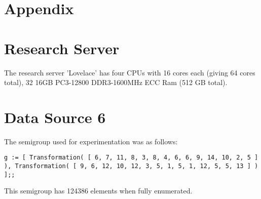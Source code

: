\documentclass{report}
\begin{document}
\section*{Appendix}

\section*{Research Server}
The research server 'Lovelace' has four CPUs with 16 cores each (giving 64 cores total), 32 16GB PC3-12800 DDR3-1600MHz ECC Ram (512 GB total). 

\section*{Data Source 6}
The semigroup used for experimentation was as follows:
\begin{lstlisting}
g := [ Transformation( [ 6, 7, 11, 8, 3, 8, 4, 6, 6, 9, 14, 10, 2, 5 ] ), Transformation( [ 9, 6, 12, 10, 12, 3, 5, 1, 5, 1, 12, 5, 5, 13 ] ) ];;
\end{lstlisting}
This semigroup has 124386 elements when fully enumerated. 


\end{document}
